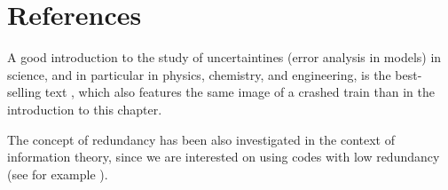 \section*{References}

A good introduction to the study of uncertaintines (error analysis in models) in science, and in particular in physics, chemistry, and engineering, is the best-selling text \cite{taylor2022introduction}, which also features the same image of a crashed train than in the introduction to this chapter.

The concept of redundancy has been also investigated in the context of information theory, since we are interested on using codes with low redundancy (see for example \cite{abramson1963information}).

